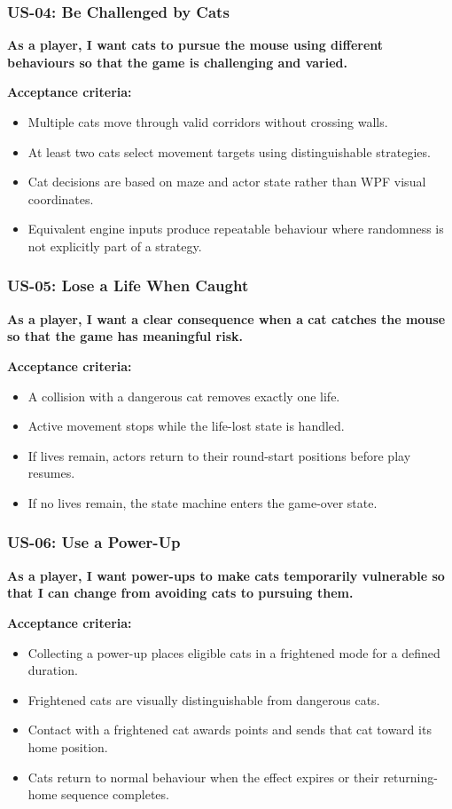 \subsubsection{US-04: Be Challenged by Cats}

\textbf{As a player, I want cats to pursue the mouse using different behaviours so that the game is challenging and varied.}

\textbf{Acceptance criteria:}
\begin{itemize}
	\item Multiple cats move through valid corridors without crossing walls.
	\item At least two cats select movement targets using distinguishable strategies.
	\item Cat decisions are based on maze and actor state rather than WPF visual coordinates.
	\item Equivalent engine inputs produce repeatable behaviour where randomness is not explicitly part of a strategy.
\end{itemize}

\subsubsection{US-05: Lose a Life When Caught}

\textbf{As a player, I want a clear consequence when a cat catches the mouse so that the game has meaningful risk.}

\textbf{Acceptance criteria:}
\begin{itemize}
	\item A collision with a dangerous cat removes exactly one life.
	\item Active movement stops while the life-lost state is handled.
	\item If lives remain, actors return to their round-start positions before play resumes.
	\item If no lives remain, the state machine enters the game-over state.
\end{itemize}

\subsubsection{US-06: Use a Power-Up}

\textbf{As a player, I want power-ups to make cats temporarily vulnerable so that I can change from avoiding cats to pursuing them.}

\textbf{Acceptance criteria:}
\begin{itemize}
	\item Collecting a power-up places eligible cats in a frightened mode for a defined duration.
	\item Frightened cats are visually distinguishable from dangerous cats.
	\item Contact with a frightened cat awards points and sends that cat toward its home position.
	\item Cats return to normal behaviour when the effect expires or their returning-home sequence completes.
\end{itemize}

